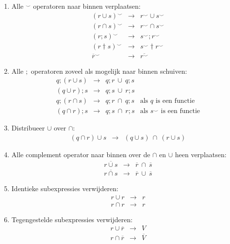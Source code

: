 \documentclass[11pt,a4paper,fleqn,oneside]{article}
\newcommand{\flip}[1]{{#1}^\smallsmile} %
\newcommand{\cmpl}[1]{\overline{#1}}
\newcommand{\compose}{;}
\begin{document}
\begin{enumerate}
\item	Alle $\flip{}$ operatoren naar binnen verplaatsen:
  \[\begin{array}{rcl}
	\flip{(r\cup s)}&\rightarrow&\flip{r}\cup\flip{s}\\
	\flip{(r\cap s)}&\rightarrow&\flip{r}\cap\flip{s}\\
	\flip{(r\compose s)}&\rightarrow&\flip{s}\compose\flip{r}\\
	\flip{(r\dagger s)}&\rightarrow&\flip{s}\dagger\flip{r}\\
	\flip{\cmpl{r}}&\rightarrow&\cmpl{\flip{r}}
  \end{array}\]
\item	Alle $\compose$ operatoren zoveel als mogelijk naar binnen schuiven:
  \[\begin{array}{rcll}
	q\compose(r\cup s)&\rightarrow&q\compose r\ \cup\ q\compose s\\
	(q\cup r)\compose s&\rightarrow&q\compose s\ \cup\ r\compose s\\
	q\compose(r\cap s)&\rightarrow&q\compose r\ \cap\ q\compose s&\text{als $q$ is een functie}\\
	(q\cap r)\compose s&\rightarrow&q\compose s\ \cap\ r\compose s&\text{als $\flip{s}$ is een functie}
  \end{array}\]
\item	Distribueer $\cup$ over $\cap$:
  \[\begin{array}{rcl}
	(q\cap r)\cup s&\rightarrow&(q\cup s)\ \cap\ (r\cup s)
  \end{array}\]
\item	Alle complement operator naar binnen over de $\cap$ en $\cup$ heen verplaatsen:
  \[\begin{array}{rcl}
	\cmpl{r\cup s}&\rightarrow&\cmpl{r}\ \cap\ \cmpl{s}\\
	\cmpl{r\cap s}&\rightarrow&\cmpl{r}\ \cup\ \cmpl{s}
  \end{array}\]
\item	Identieke subexpressies verwijderen:
  \[\begin{array}{rcl}
	r\cup r&\rightarrow&r\\
	r\cap r&\rightarrow&r
  \end{array}\]
\item	Tegengestelde subexpressies verwijderen:
  \[\begin{array}{rcl}
	r\cup \cmpl{r}&\rightarrow&V\\
	r\cap \cmpl{r}&\rightarrow&\cmpl{V}
  \end{array}\]

\end{enumerate}
\end{document}

